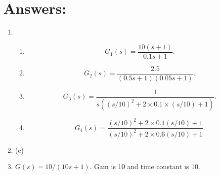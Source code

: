 \documentclass{article}
\newcommand{\tikzdir}[1]{tikz/#1.tikz}
\newcommand{\inputtikz}[1]{}}
\begin{document}
\section*{Answers:}
\begin{enumerate}
\item 
  \begin{enumerate}
  \item  \[G_1(s)=\frac{10(s+1)}{0.1s+1}.\]
  \begin{figure}[ht]
    \centering
    \inputtikz{Tut81a}
  \end{figure}
  \newpage
  \item  \[G_2(s)=\frac{2.5}{(0.5s+1)(0.05s+1)}.\]
  \begin{figure}[ht]
    \centering
    \inputtikz{Tut81b}
  \end{figure}
  \newpage
  \item  \[G_3(s) = \frac{1}{s((s/10)^2+2\times 0.1 \times (s/10)+1)}.\]
  \begin{figure}[ht]
    \centering
    \inputtikz{Tut81c}
  \end{figure}
  \newpage
  \item  \[G_4(s) = \frac{(s/10)^2+2\times 0.1(s/10)+1}{(s/10)^2+2\times 0.6(s/10)+1}.\] 
  \begin{figure}[ht]
    \centering
    \inputtikz{Tut81d}
  \end{figure}
  \end{enumerate}

\item (c)
\item $G(s) = 10/(10s+1)$. Gain is 10 and time constant is 10.
\end{enumerate}
\end{document}
